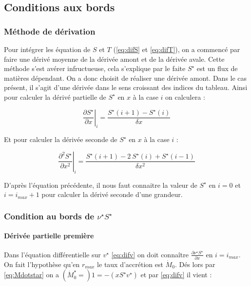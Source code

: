 \subsection{Conditions aux bords}


\subsubsection{Méthode de dérivation}

Pour intégrer les équation de $S$ et $T$ (\eqref{eq:difS} et \eqref{eq:difT}), on a commencé par faire une dérivé moyenne de la dérivée amont et de la dérivée avale. Cette méthode s'est avérer infructueuse, cela s'explique par le faite $S^{\star}$ est un flux de matières dépendant. On a donc choisit de réaliser une dérivée amont. Dans le cas présent, il s'agit d'une dérivée dans le sens croissant des indices du tableau. Ainsi pour calculer la dérivé partielle de $S^{\star}$ en $x$ à la case $i$ on calculera :

\begin{equation}
  \left. \frac{\partial S^{\star}}{\partial x} \right|_i = \frac{S^{\star}(i+1)-S^{\star}(i)}{\delta x} 
\end{equation}

Et pour calculer la dérivée seconde de $S^{\star}$ en $x$ à la case $i$ :

\begin{equation}
  \left. \frac{\partial^2 S^{\star}}{\partial x^2}\right|_i=\frac{S^{\star}(i+1)-2\ S^{\star}(i) +S^{\star}(i-1)}{\delta x^2} 
\end{equation}

D'après l'équation précédente, il nous faut connaitre la valeur de $S^{\star}$ en $i=0$ et $i=i_{max}+1$ pour calculer la dérivé seconde d'une grandeur.

\subsubsection{Condition au bords de $\nu^{\star}S^{\star}$}
 
\paragraph{Dérivée partielle première}
Dans l'équation différentielle sur $v^{\star}$ \eqref{eq:difv} on doit connaître $\frac{\partial \nu^{\star} S^{\star}}{\partial x}$ en $i=i_{max}$. On fait l'hypothèse qu'en $r_{max}$ le taux d'accrétion est $\dot{M}_0$. Dés lors par \eqref{eq:Mdotstar} on a $(\dot{M}^{\star}_0=)1 = -(x S^{\star}v^{\star})$ et par \eqref{eq:difv} il vient :

